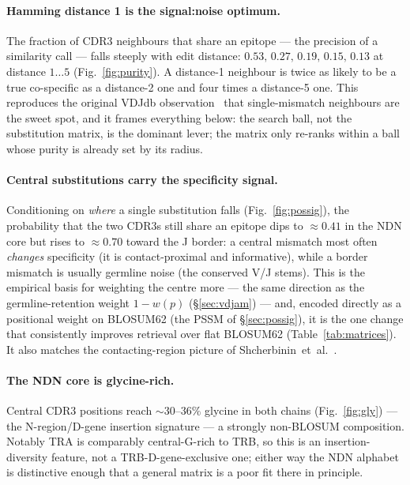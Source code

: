 \documentclass[11pt]{article}
\theoremstyle{oldplain}
\theoremstyle{oldrem}
\begin{document}
\paragraph{Hamming distance 1 is the signal:noise optimum.} The fraction of CDR3 neighbours that share
an epitope --- the precision of a similarity call --- falls steeply with edit distance:
$0.53,\,0.27,\,0.19,\,0.15,\,0.13$ at distance $1\ldots5$ (Fig.~\ref{fig:purity}). A distance-1
neighbour is twice as likely to be a true co-specific as a distance-2 one and four times a distance-5
one. This reproduces the original VDJdb observation~\cite{Shugay2018} that single-mismatch neighbours
are the sweet spot, and it frames everything below: the search ball, not the substitution matrix, is
the dominant lever; the matrix only re-ranks within a ball whose purity is already set by its radius.

\paragraph{Central substitutions carry the specificity signal.} Conditioning on \emph{where} a single
substitution falls (Fig.~\ref{fig:possig}), the probability that the two CDR3s still share an epitope
dips to $\approx0.41$ in the NDN core but rises to $\approx0.70$ toward the J border: a central
mismatch most often \emph{changes} specificity (it is contact-proximal and informative), while a
border mismatch is usually germline noise (the conserved V/J stems). This is the empirical basis for
weighting the centre more --- the same direction as the germline-retention weight $1-w(p)$
(\S\ref{sec:vdjam}) --- and, encoded directly as a positional weight on BLOSUM62 (the PSSM of
\S\ref{sec:possig}), it is the one change that consistently improves retrieval over flat BLOSUM62
(Table~\ref{tab:matrices}). It also matches the contacting-region picture of
Shcherbinin~et~al.~\cite{Shcherbinin2023}.

\paragraph{The NDN core is glycine-rich.} Central CDR3 positions reach $\sim30$--$36\%$ glycine in
both chains (Fig.~\ref{fig:gly}) --- the N-region/D-gene insertion signature --- a strongly
non-BLOSUM composition. Notably TRA is comparably central-G-rich to TRB, so this is an
insertion-diversity feature, not a TRB-D-gene-exclusive one; either way the NDN alphabet is distinctive
enough that a general matrix is a poor fit there in principle.
\end{document}
